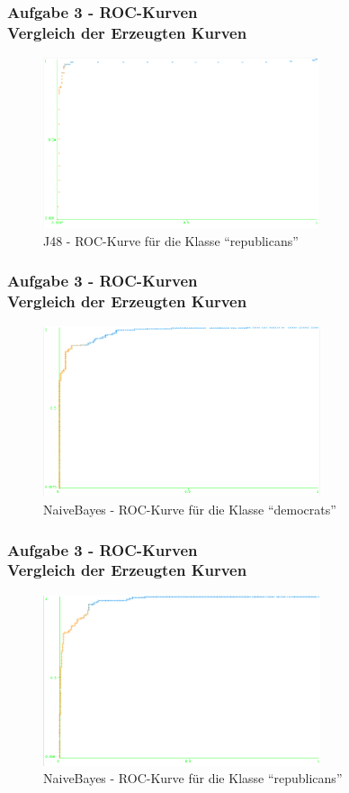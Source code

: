 \documentclass[accentcolor=tud6b,colorbacktitle,inverttitle,landscape,german,presentation,t]{tudbeamer}
\begin{document}
    \begin{frame}[t]
    \frametitle{Aufgabe 3 - ROC-Kurven\\ Vergleich der Erzeugten Kurven}
        \begin{figure}[htbp]
            \centering
            \includegraphics[height=5cm]{roc-j48-republicans}
            \caption{J48 - ROC-Kurve für die Klasse ``republicans''}
        \end{figure}
    \end{frame}
    
    \begin{frame}[t]
    \frametitle{Aufgabe 3 - ROC-Kurven\\ Vergleich der Erzeugten Kurven}
        \begin{figure}[htbp]
            \centering
            \includegraphics[height=5cm]{roc-naivebayes-democrats}
            \caption{NaiveBayes - ROC-Kurve für die Klasse ``democrats''}
        \end{figure}
    \end{frame}
    
    \begin{frame}[t]
    \frametitle{Aufgabe 3 - ROC-Kurven\\ Vergleich der Erzeugten Kurven}
        \begin{figure}[htbp]
            \centering
            \includegraphics[height=5cm]{roc-naivebayes-republicans}
            \caption{NaiveBayes - ROC-Kurve für die Klasse ``republicans''}
        \end{figure}
    \end{frame}
    
\end{document}
